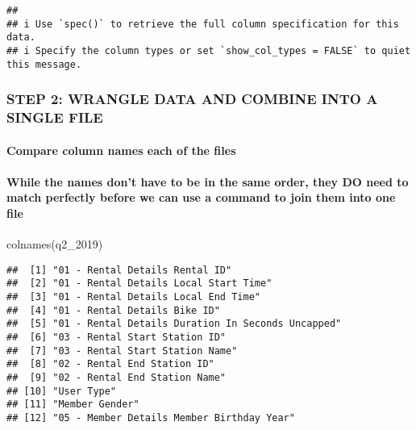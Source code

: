 \documentclass[
]{article}
\newenvironment{Shaded}{\begin{snugshade}}{\end{snugshade}}
\newcommand{\FunctionTok}[1]{\textcolor[rgb]{0.00,0.00,0.00}{#1}}
\newcommand{\NormalTok}[1]{#1}
\begin{document}
\begin{verbatim}
## 
## i Use `spec()` to retrieve the full column specification for this data.
## i Specify the column types or set `show_col_types = FALSE` to quiet this message.
\end{verbatim}

\hypertarget{step-2-wrangle-data-and-combine-into-a-single-file}{%
\subsubsection{STEP 2: WRANGLE DATA AND COMBINE INTO A SINGLE
FILE}\label{step-2-wrangle-data-and-combine-into-a-single-file}}

\hypertarget{compare-column-names-each-of-the-files}{%
\paragraph{Compare column names each of the
files}\label{compare-column-names-each-of-the-files}}

\hypertarget{while-the-names-dont-have-to-be-in-the-same-order-they-do-need-to-match-perfectly-before-we-can-use-a-command-to-join-them-into-one-file}{%
\paragraph{While the names don't have to be in the same order, they DO
need to match perfectly before we can use a command to join them into
one
file}\label{while-the-names-dont-have-to-be-in-the-same-order-they-do-need-to-match-perfectly-before-we-can-use-a-command-to-join-them-into-one-file}}

\begin{Shaded}
\begin{Highlighting}[]
\FunctionTok{colnames}\NormalTok{(q2\_2019)}
\end{Highlighting}
\end{Shaded}

\begin{verbatim}
##  [1] "01 - Rental Details Rental ID"                   
##  [2] "01 - Rental Details Local Start Time"            
##  [3] "01 - Rental Details Local End Time"              
##  [4] "01 - Rental Details Bike ID"                     
##  [5] "01 - Rental Details Duration In Seconds Uncapped"
##  [6] "03 - Rental Start Station ID"                    
##  [7] "03 - Rental Start Station Name"                  
##  [8] "02 - Rental End Station ID"                      
##  [9] "02 - Rental End Station Name"                    
## [10] "User Type"                                       
## [11] "Member Gender"                                   
## [12] "05 - Member Details Member Birthday Year"
\end{verbatim}
\end{document}
